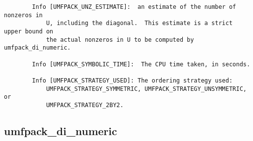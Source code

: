 \documentclass[11pt]{article}
\begin{document}
{\begin{verbatim}
        Info [UMFPACK_UNZ_ESTIMATE]:  an estimate of the number of nonzeros in
            U, including the diagonal.  This estimate is a strict upper bound on
            the actual nonzeros in U to be computed by umfpack_di_numeric.

        Info [UMFPACK_SYMBOLIC_TIME]:  The CPU time taken, in seconds.

        Info [UMFPACK_STRATEGY_USED]: The ordering strategy used:
            UMFPACK_STRATEGY_SYMMETRIC, UMFPACK_STRATEGY_UNSYMMETRIC, or
            UMFPACK_STRATEGY_2BY2.
\end{verbatim}
}


\newpage
\subsection{umfpack\_di\_numeric}
\end{document}

